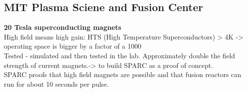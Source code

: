 \subsection{MIT Plasma Sciene and Fusion Center}
\textbf{20 Tesla superconducting magnets} \\
High field means high gain: 
HTS (High Temperature Superconductors) > 4K -> operating space is bigger by a factor of a 1000\\
Tested - simulated and then tested in the lab. Approximately double the field strength of current magnets.-> to build SPARC as a proof of concept.\\
SPARC proofs that high field magnets are possible and that fusion reactors can run for about 10 seconds per pulse. 

